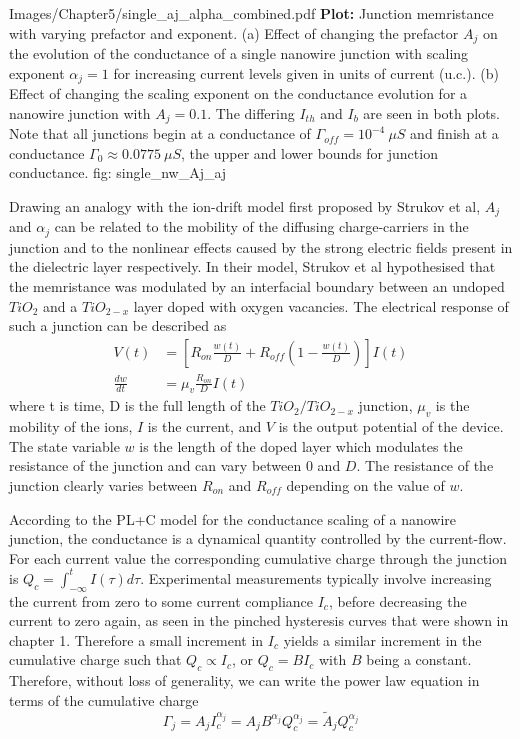 {Images/Chapter5/single_aj_alpha_combined.pdf}
{\textbf{Plot:} Junction memristance with varying prefactor and exponent.}
{(a) Effect of changing the prefactor $A_j$ on the evolution of the conductance of a single nanowire junction with scaling exponent $\alpha_j = 1$ for increasing current levels given in units of current (u.c.). (b) Effect of changing the scaling exponent on the conductance evolution for a nanowire junction with $A_j = 0.1$. The differing $I_{th}$ and $I_b$ are seen in both plots. Note that all junctions begin at a conductance of $\Gamma_{off} = 10^{-4}~\mu S$ and finish at a conductance $\Gamma_0 \approx 0.0775~ \mu S$, the upper and lower bounds for junction conductance.}
{fig: single_nw_Aj_aj}

Drawing an analogy with the ion-drift model first proposed by Strukov et al\cite{strukov2008}, $A_j$ and $\alpha_j$ can be related to the mobility of the diffusing charge-carriers in the junction and to the nonlinear effects caused by the strong electric fields present in the dielectric layer \cite{scaling2018} respectively. In their model, Strukov et al hypothesised that the memristance was modulated by an interfacial boundary between an undoped $TiO_2$ and a $TiO_{2-x}$ layer doped with oxygen vacancies. The electrical response of such a junction can be described as
\begin{align}
V(t) & = \left[ R_{on} \frac{w(t)}{D} + R_{off} \left( 1 - \frac{w(t)}{D} \right) \right] I(t) \nonumber \\
\frac{dw}{dt} & = \mu_v\frac{R_{on}}{D} I(t) 
\label{eq: ion-drift-eqn}
\end{align}
where t is time, D is the full length of the $TiO_2/TiO_{2-x}$ junction, $\mu_v$ is the mobility of the ions, $I$ is the current, and $V$ is the output potential of the device. The state variable $w$ is the length of the doped layer which modulates the resistance of the junction and can vary between $0$ and $D$. The resistance of the junction clearly varies between $R_{on}$ and $R_{off}$ depending on the value of $w$.

According to the PL+C model for the conductance scaling of a nanowire junction, the conductance is a dynamical quantity controlled by the current-flow. For each current value the corresponding cumulative charge through the junction is $Q_c = \int_{-\infty}^{t} I(\tau) d\tau$. Experimental measurements typically involve increasing the current from zero to some current compliance $I_c$, before decreasing the current to zero again\cite{scaling2018}, as seen in the pinched hysteresis curves that were shown in chapter 1. Therefore a small increment in $I_c$ yields a similar increment in the cumulative charge such that $Q_c \propto I_c$, or $Q_c = B I_c$ with $B$ being a constant. Therefore, without loss of generality, we can write the power law equation in terms of the cumulative charge 
\begin{equation}
\Gamma_j = A_j I_c^{\alpha_j} = A_j B^{\alpha_j} Q_c^{\alpha_j} = \tilde{A}_j Q_c^{\alpha_j}
\end{equation}

